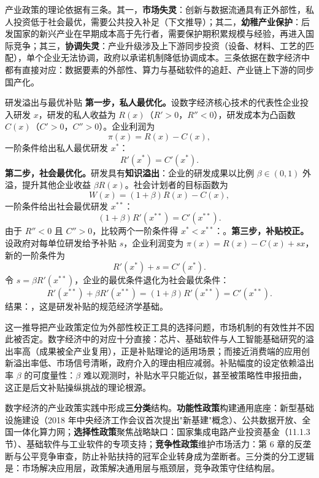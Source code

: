 产业政策的理论依据有三条。其一，\textbf{市场失灵}：创新与数据流通具有正外部性，私人投资低于社会最优，需要公共投入补足（下文推导）；其二，\textbf{幼稚产业保护}：后发国家的新兴产业在早期成本高于先行者，需要保护期积累规模与经验，再进入国际竞争；其三，\textbf{协调失灵}：产业升级涉及上下游同步投资（设备、材料、工艺的匹配），单个企业无法协调，政府以承诺机制降低协调成本。三条依据在数字经济中都有直接对应：数据要素的外部性、算力与基础软件的追赶、产业链上下游的同步国产化。

\begin{derivation}{研发溢出与最优补贴}{}
\textbf{第一步，私人最优化。}设数字经济核心技术的代表性企业投入研发 $x$，研发的私人收益为 $R(x)$（$R' > 0$，$R'' < 0$），研发成本为凸函数 $C(x)$（$C' > 0$，$C'' > 0$）。企业利润为
\[
\pi(x) = R(x) - C(x),
\]
一阶条件给出私人最优研发 $x^*$：
\[
R'(x^*) = C'(x^*).
\]
\textbf{第二步，社会最优化。}研发具有\textbf{知识溢出}：企业的研发成果以比例 $\beta \in (0,1)$ 外溢，提升其他企业收益 $\beta R(x)$。社会计划者的目标函数为
\[
W(x) = (1+\beta)R(x) - C(x),
\]
一阶条件给出社会最优研发 $x^{**}$：
\[
(1+\beta)R'(x^{**}) = C'(x^{**}).
\]
由于 $R'' < 0$ 且 $C'' > 0$，比较两个一阶条件得 $x^* < x^{**}$：。\textbf{第三步，补贴校正。}设政府对每单位研发给予补贴 $s$，企业利润变为 $\pi(x) = R(x) - C(x) + sx$，新的一阶条件为
\[
R'(x^*) + s = C'(x^*).
\]
令 $s = \beta R'(x^{**})$，企业的最优条件退化为社会最优条件：
\[
R'(x^{**}) + \beta R'(x^{**}) = (1+\beta)R'(x^{**}) = C'(x^{**}).
\]
结果：，这是研发补贴的规范经济学基础。
\end{derivation}

这一推导把产业政策定位为外部性校正工具的选择问题，市场机制的有效性并不因此被否定。数字经济中的对应十分直接：芯片、基础软件与人工智能基础研究的溢出率高（成果被全产业复用），正是补贴理论的适用场景；而接近消费端的应用创新溢出率低、市场信号清晰，政府介入的理由相应减弱。补贴幅度的设定依赖溢出率 $\beta$ 的可度量性：$\beta$ 难以观测时，补贴水平只能近似，甚至被策略性申报扭曲，这正是后文补贴操纵挑战的理论根源。

数字经济的产业政策实践中形成\textbf{三分类}结构。\textbf{功能性政策}构建通用底座：新型基础设施建设（2018 年中央经济工作会议首次提出"新基建"概念）、公共数据开放、全国一体化算力网；\textbf{选择性政策}聚焦战略缺口：国家集成电路产业投资基金（11.1.3 节）、基础软件与工业软件的专项支持；\textbf{竞争性政策}维护市场活力：第 6 章的反垄断与公平竞争审查，防止补贴扶持的冠军企业转身成为垄断者。三分类的分工逻辑是：市场解决应用层，政策解决通用层与瓶颈层，竞争政策守住结构层。

